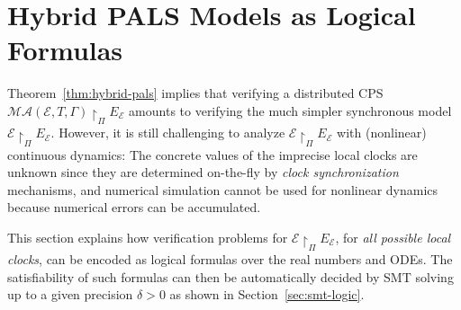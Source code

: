 

\section{Hybrid PALS Models as Logical Formulas}
\label{sec:smt-encoding}

Theorem~\ref{thm:hybrid-pals} implies that 
 verifying 
 a distributed CPS $\mathcal{MA}(\mathcal{E}, T, \Gamma) \restriction_{\Pi} E_\mathcal{E}$
amounts to  verifying the much  simpler synchronous model $\mathcal{E} \restriction_{\Pi} E_\mathcal{E}$.
However, it is still challenging to analyze $\mathcal{E} \restriction_{\Pi} E_\mathcal{E}$ 
with (nonlinear)  continuous dynamics: 
The concrete values of the imprecise local clocks are unknown since they  %
are determined on-the-fly by  \emph{clock synchronization} mechanisms, 
and 
numerical simulation cannot  be used for nonlinear dynamics
because numerical errors can be accumulated.

This section explains how verification  problems for  
$\mathcal{E}\restriction_{\Pi}E_\mathcal{E}$, for \emph{all possible local clocks},
can be  encoded as logical formulas over the real numbers and ODEs.
The satisfiability of such formulas can then be automatically decided by SMT solving up to a given precision $\delta > 0$
as shown in Section~\ref{sec:smt-logic}.


